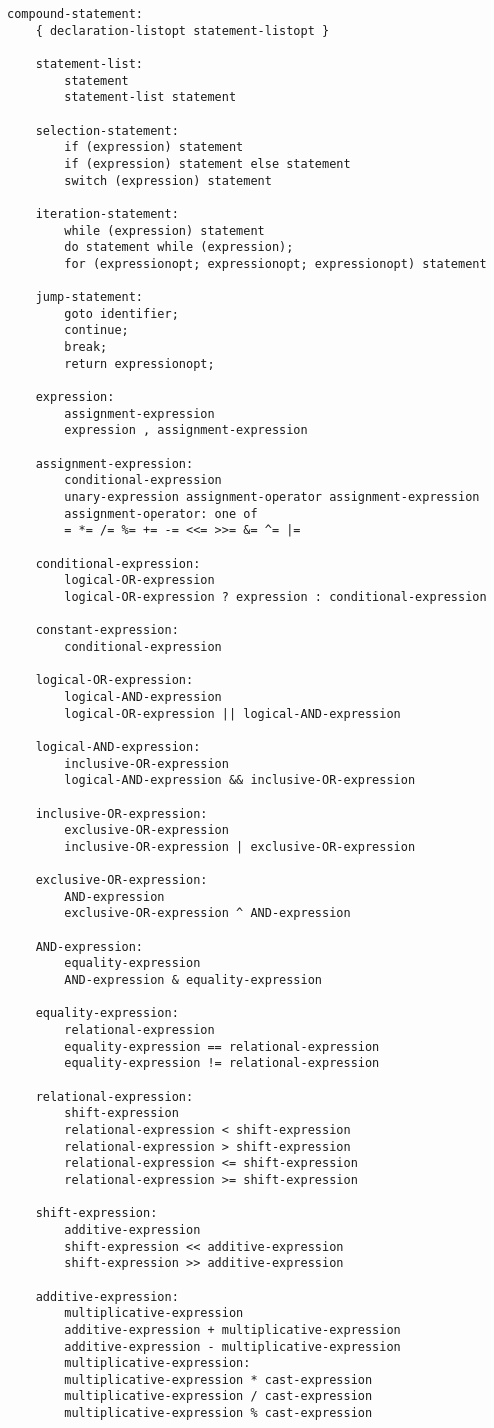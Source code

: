 \begin{lstlisting}[basicstyle=\ttfamily\normalsize\itshape, keywordstyle=\color{black}, stringstyle=\color{black}]
	compound-statement:
	{ declaration-listopt statement-listopt }

	statement-list:
		statement
		statement-list statement

	selection-statement:
		if (expression) statement
		if (expression) statement else statement
		switch (expression) statement

	iteration-statement:
		while (expression) statement
		do statement while (expression);
		for (expressionopt; expressionopt; expressionopt) statement

	jump-statement:
		goto identifier;
		continue;
		break;
		return expressionopt;

	expression:
		assignment-expression
		expression , assignment-expression

	assignment-expression:
		conditional-expression
		unary-expression assignment-operator assignment-expression
		assignment-operator: one of
		= *= /= %= += -= <<= >>= &= ^= |=

	conditional-expression:
		logical-OR-expression
		logical-OR-expression ? expression : conditional-expression

	constant-expression:
		conditional-expression

	logical-OR-expression:
		logical-AND-expression
		logical-OR-expression || logical-AND-expression

	logical-AND-expression:
		inclusive-OR-expression
		logical-AND-expression && inclusive-OR-expression

	inclusive-OR-expression:
		exclusive-OR-expression
		inclusive-OR-expression | exclusive-OR-expression

	exclusive-OR-expression:
		AND-expression
		exclusive-OR-expression ^ AND-expression

	AND-expression:
		equality-expression
		AND-expression & equality-expression

	equality-expression:
		relational-expression
		equality-expression == relational-expression
		equality-expression != relational-expression

	relational-expression:
		shift-expression
		relational-expression < shift-expression
		relational-expression > shift-expression
		relational-expression <= shift-expression
		relational-expression >= shift-expression

	shift-expression:
		additive-expression
		shift-expression << additive-expression
		shift-expression >> additive-expression

	additive-expression:
		multiplicative-expression
		additive-expression + multiplicative-expression
		additive-expression - multiplicative-expression
		multiplicative-expression:
		multiplicative-expression * cast-expression
		multiplicative-expression / cast-expression
		multiplicative-expression % cast-expression


\end{lstlisting}
